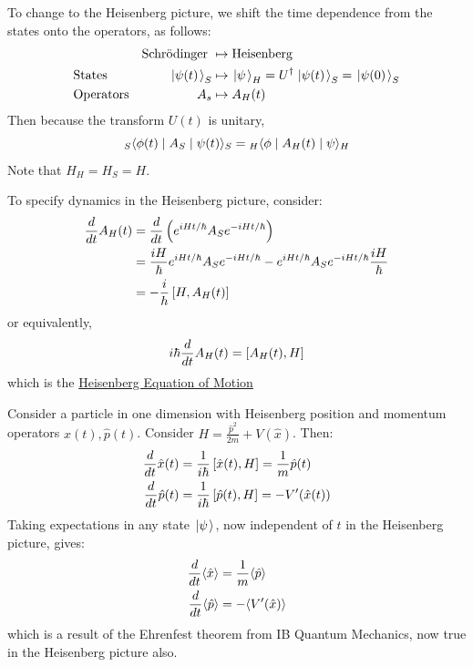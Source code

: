 \documentclass[../Main.tex]{subfiles}
\begin{document}
To change to the Heisenberg picture, we shift the time dependence from the states onto the operators, as follows:
\begin{align*}
    && \text{Schr\"odinger~} &\mapsto \text{Heisenberg}\\
    &\text{States} & \left.\left|\psi(t)\right.\right\rangle_S &\mapsto \left.\left|\psi\right.\right\rangle_H = U^\dagger \left.\left|\psi(t)\right.\right\rangle_S = \left.\left|\psi(0)\right.\right\rangle_S \\
    &\text{Operators} & A_s &\mapsto A_H(t)
\end{align*}
Then because the transform $U(t)$ is unitary,
\begin{equation*}
    {}_S\langle\phi(t)\mid A_S\mid\psi(t)\rangle_S = {}_H \langle\phi\mid A_H(t)\mid\psi\rangle_H
\end{equation*}
Note that $H_H = H_S = H$. %

To specify dynamics in the Heisenberg picture, consider:
\begin{align*}
    \frac{d}{dt} A_H(t) &= \frac{d}{dt} \left(e^{iHt / \hbar} A_S e^{-iHt / \hbar}\right) \\
    &= \frac{iH}{\hbar} e^{iHt/\hbar} A_S e^{-iHt/\hbar} - e^{iHt/\hbar} A_S e^{-iHt/\hbar} \frac{iH}{\hbar} \\
    &= -\frac{i}{h} \left[H, A_H(t)\right]
\end{align*}
or equivalently,
\begin{equation}
    i\hbar \frac{d}{dt} A_H(t) = \left[A_H(t), H\right]
    \label{eqnHeisMotion}
\end{equation}
which is the \underline{Heisenberg Equation of Motion}
\begin{example}
    Consider a particle in one dimension with Heisenberg position and momentum operators $\hat{x}(t), \hat{p}(t)$. Consider $H = \frac{\hat{p}^2}{2m} + V(\hat{x})$. Then:
    \begin{align*}
        \frac{d}{dt} \hat{x}(t) &= \frac{1}{i\hbar} \left[\hat{x}(t), H\right] = \frac1m \hat{p}(t) \\
        \frac{d}{dt} \hat{p}(t) &= \frac1{i\hbar} \left[\hat{p}(t), H\right] = -V'(\hat{x}(t))
    \end{align*}
    Taking expectations in any state $\left.\left|\psi\right.\right\rangle$, now independent of $t$ in the Heisenberg picture, gives:
    \begin{align*}
        \frac{d}{dt} \langle \hat{x} \rangle &= \frac1m \langle \hat{p} \rangle \\
        \frac{d}{dt} \langle \hat{p} \rangle &= -\langle V'(\hat{x}) \rangle
    \end{align*}
    which is a result of the Ehrenfest theorem from IB Quantum Mechanics, now true in the Heisenberg picture also.
\end{example}
\end{document}
